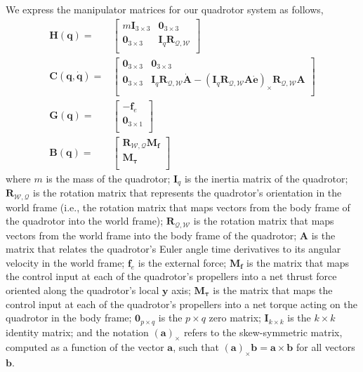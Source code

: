 We express the manipulator matrices for our quadrotor system as follows,
%
\begin{equation}
\begin{aligned}
\mathbf{H}(\mathbf{q}) = &
\begin{bmatrix}
m\mathbf{I}_{3\times3} & \mathbf{0}_{3\times3} \\
\mathbf{0}_{3\times3}  & \mathbf{I}_{q} \mathbf{R}_{\mathcal{Q},\mathcal{W}} \\
\end{bmatrix} \\
%
\mathbf{C}(\mathbf{q},\dot{\mathbf{q}}) = &
\begin{bmatrix}
\mathbf{0}_{3\times3} & \mathbf{0}_{3\times3}  \\
\mathbf{0}_{3\times3} & \mathbf{I}_q \mathbf{R}_{\mathcal{Q},\mathcal{W}} \dot{\mathbf{A}} - \left(\mathbf{I}_q \mathbf{R}_{\mathcal{Q},\mathcal{W}} \mathbf{A} \dot{\mathbf{e}} \right)_{\times}\mathbf{R}_{\mathcal{Q},\mathcal{W}} \mathbf{A} \\
\end{bmatrix} \\
%
\mathbf{G}(\mathbf{q}) = &
\begin{bmatrix}
-\mathbf{f}_e \\
\mathbf{0}_{3\times1} \\
\end{bmatrix} \\
%
\mathbf{B}(\mathbf{q}) = &
\begin{bmatrix}
\mathbf{R}_{\mathcal{W},\mathcal{Q}} \mathbf{M}_{\mathbf{f}} \\
\mathbf{M}_{\mathbf{\tau}}                                   \\
\end{bmatrix}
\end{aligned}
\end{equation}
%
where $m$ is the mass of the quadrotor;
$\mathbf{I}_q$ is the inertia matrix of the quadrotor;
$\mathbf{R}_{\mathcal{W},\mathcal{Q}}$ is the rotation matrix that represents the quadrotor's orientation in the world frame (i.e., the rotation matrix that maps vectors from the body frame of the quadrotor into the world frame);
$\mathbf{R}_{\mathcal{Q},\mathcal{W}}$ is the rotation matrix that maps vectors from the world frame into the body frame of the quadrotor;
$\mathbf{A}$ is the matrix that relates the quadrotor's Euler angle time derivatives to its angular velocity in the world frame;
$\mathbf{f}_e$ is the external force;
$\mathbf{M}_{\mathbf{f}}$ is the matrix that maps the control input at each of the quadrotor's propellers into a net thrust force oriented along the quadrotor's local $\mathbf{y}$ axis;
$\mathbf{M}_{\mathbf{\tau}}$ is the matrix that maps the control input at each of the quadrotor's propellers into a net torque acting on the quadrotor in the body frame;
$\mathbf{0}_{p \times q}$ is the $p \times q$ zero matrix;
$\mathbf{I}_{k \times k}$ is the $k \times k$ identity matrix;
and the notation $\left( \mathbf{a} \right)_{\times}$ refers to the skew-symmetric matrix, computed as a function of the vector $\mathbf{a}$, such that $\left(\mathbf{a}\right)_{\times}\mathbf{b} = \mathbf{a}\times\mathbf{b}$ for all vectors $\mathbf{b}$.

